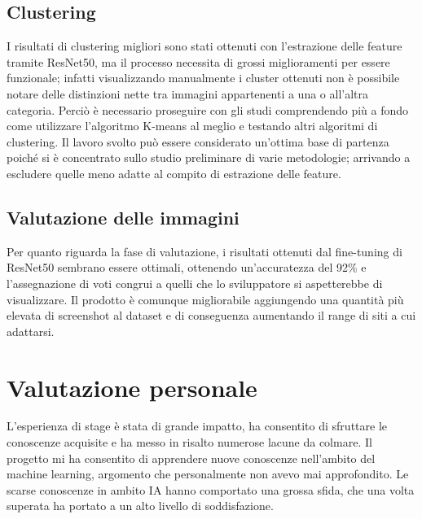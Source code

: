 \subsection{Clustering}
I risultati di clustering migliori sono stati ottenuti con l'estrazione delle feature tramite ResNet50, ma il processo necessita di grossi miglioramenti per essere funzionale;
infatti visualizzando manualmente i cluster ottenuti non è possibile notare delle distinzioni nette tra immagini appartenenti a una o all'altra categoria.
Perciò è necessario proseguire con gli studi comprendendo più a fondo come utilizzare l'algoritmo K-means al meglio e testando altri algoritmi di clustering.
Il lavoro svolto può essere considerato un'ottima base di partenza poiché si è concentrato sullo studio preliminare di varie metodologie; arrivando a escludere quelle meno adatte al compito di estrazione delle feature.

\subsection{Valutazione delle immagini}
Per quanto riguarda la fase di valutazione, i risultati ottenuti dal fine-tuning di ResNet50 sembrano essere ottimali, ottenendo un'accuratezza del 92\% e l'assegnazione di voti congrui a quelli che lo sviluppatore si aspetterebbe di visualizzare.
Il prodotto è comunque migliorabile aggiungendo una quantità più elevata di screenshot al dataset e di conseguenza aumentando il range di siti a cui adattarsi.

\section{Valutazione personale}
L'esperienza di stage è stata di grande impatto, ha consentito di sfruttare le conoscenze acquisite e ha messo in risalto numerose lacune da colmare.
Il progetto mi ha consentito di apprendere nuove conoscenze nell'ambito del machine learning, argomento che personalmente non avevo mai approfondito. 
Le scarse conoscenze in ambito IA hanno comportato una grossa sfida, che una volta superata ha portato a un alto livello di soddisfazione.

